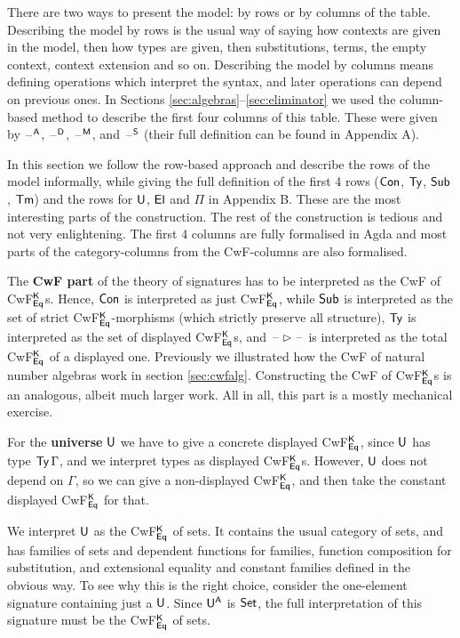 \documentclass[acmsmall,screen]{acmart}
\begin{document}
There are two ways to present the model: by rows or by columns of the
table. Describing the model by rows is the usual way of saying how
contexts are given in the model, then how types are given, then
substitutions, terms, the empty context, context extension and so on.
Describing the model by columns means defining operations which
interpret the syntax, and later operations can depend on previous
ones. In Sections \ref{sec:algebras}--\ref{sec:eliminator} we used the
column-based method to describe the first four columns of this
table. These were given by $\mathord{\hspace{1pt}\text{--}\hspace{1pt}}^{\mathsf{A}}$, $\mathord{\hspace{1pt}\text{--}\hspace{1pt}}^{\mathsf{D}}$, $\mathord{\hspace{1pt}\text{--}\hspace{1pt}}^{\mathsf{M}}$, and
$\mathord{\hspace{1pt}\text{--}\hspace{1pt}}^{\mathsf{S}}$ (their full definition can be found in Appendix A).

In this section we follow the row-based approach and describe the rows
of the model informally, while giving the full definition of the first
4 rows ($\mathsf{Con}$, $\mathsf{Ty}$, $\mathsf{Sub}$, $\mathsf{Tm}$) and the rows for $\mathsf{U}$, $\mathsf{El}$ and
$\Pi$ in Appendix B. These are the most interesting parts of the
construction. The rest of the construction is tedious and not very
enlightening. The first 4 columns are fully formalised in Agda and
most parts of the category-columns from the CwF-columns are also
formalised.

The \textbf{CwF part} of the theory of signatures has to be
interpreted as the CwF of CwF$^{\mathsf{K}}_{\mathsf{Eq}}$s. Hence, $\mathsf{Con}$ is
interpreted as just CwF$^{\mathsf{K}}_{\mathsf{Eq}}$, while $\mathsf{Sub}$ is interpreted as the
set of strict CwF$^{\mathsf{K}}_{\mathsf{Eq}}$-morphisms (which strictly preserve all
structure), $\mathsf{Ty}$ is interpreted as the set of displayed
CwF$^{\mathsf{K}}_{\mathsf{Eq}}$s, and $\mathord{\hspace{1pt}\text{--}\hspace{1pt}}\rhd\mathord{\hspace{1pt}\text{--}\hspace{1pt}}$ is interpreted as the total
CwF$^{\mathsf{K}}_{\mathsf{Eq}}$ of a displayed one. Previously we illustrated how the
CwF of natural number algebras work in section
\ref{sec:cwfalg}. Constructing the CwF of CwF$^{\mathsf{K}}_{\mathsf{Eq}}$s is an
analogous, albeit much larger work. All in all, this part is a mostly
mechanical exercise.

For the \textbf{universe} $\mathsf{U}$ we have to give a concrete displayed
CwF$^{\mathsf{K}}_{\mathsf{Eq}}$, since $\mathsf{U}$ has type $\mathsf{Ty}\,\Gamma$, and we interpret
types as displayed CwF$^{\mathsf{K}}_{\mathsf{Eq}}$s.  However, $\mathsf{U}$ does not depend on
$\Gamma$, so we can give a non-displayed CwF$^{\mathsf{K}}_{\mathsf{Eq}}$, and then take
the constant displayed CwF$^{\mathsf{K}}_{\mathsf{Eq}}$ for that.

We interpret $\mathsf{U}$ as the CwF$^{\mathsf{K}}_{\mathsf{Eq}}$ of sets. It contains the
usual category of sets, and has families of sets and dependent
functions for families, function composition for substitution, and
extensional equality and constant families defined in the obvious way.
To see why this is the right choice, consider the one-element
signature containing just a $\mathsf{U}$. Since $\mathsf{U}^{\mathsf{A}}$ is $\mathsf{Set}$, the full
interpretation of this signature must be the CwF$^{\mathsf{K}}_{\mathsf{Eq}}$ of sets.
\end{document}
